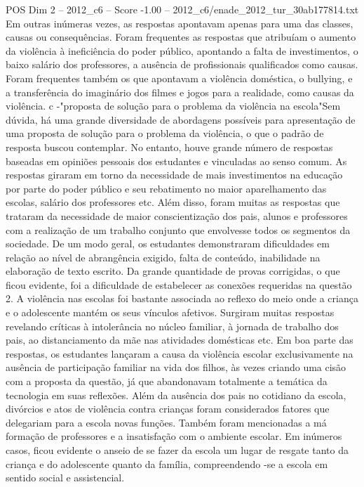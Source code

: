 \begin{textsample}{POS Dim 2 – 2012\_c6 – Score -1.00 – 2012\_c6/enade\_2012\_tur\_30ab177814.txt}
Em outras inúmeras vezes, as respostas apontavam apenas para uma das classes, causas ou consequências.
Foram frequentes as respostas que atribuíam o aumento da violência à ineficiência do poder público, apontando a falta de investimentos, o baixo salário dos professores, a ausência de profissionais qualificados como causas.
Foram frequentes também os que apontavam a violência doméstica, o bullying, e a transferência do imaginário dos filmes e jogos para a realidade, como causas da violência. c -"proposta de solução para o problema da violência na escola"Sem dúvida, há uma grande diversidade de abordagens possíveis para apresentação de uma proposta de solução para o problema da violência, o que o padrão de resposta buscou contemplar.
No entanto, houve grande número de respostas baseadas em opiniões pessoais dos estudantes e vinculadas ao senso comum.
As respostas giraram em torno da necessidade de mais investimentos na educação por parte do poder público e seu rebatimento no maior aparelhamento das escolas, salário dos professores etc.
Além disso, foram muitas as respostas que trataram da necessidade de maior conscientização dos pais, alunos e professores com a realização de um trabalho conjunto que envolvesse todos os segmentos da sociedade.
De um modo geral, os estudantes demonstraram dificuldades em relação ao nível de abrangência exigido, falta de conteúdo, inabilidade na elaboração de texto escrito.
Da grande quantidade de provas corrigidas, o que ficou evidente, foi a dificuldade de estabelecer as conexões requeridas na questão 2.
A violência nas escolas foi bastante associada ao reflexo do meio onde a criança e o adolescente mantém os seus vínculos afetivos.
Surgiram muitas respostas revelando críticas à intolerância no núcleo familiar, à jornada de trabalho dos pais, ao distanciamento da mãe nas atividades domésticas etc.
Em boa parte das respostas, os estudantes lançaram a causa da violência escolar exclusivamente na ausência de participação familiar na vida dos filhos, às vezes criando uma cisão com a proposta da questão, já que abandonavam totalmente a temática da tecnologia em suas reflexões.
Além da ausência dos pais no cotidiano da escola, divórcios e atos de violência contra crianças foram considerados fatores que delegariam para a escola novas funções.
Também foram mencionadas a má formação de professores e a insatisfação com o ambiente escolar.
Em inúmeros casos, ficou evidente o anseio de se fazer da escola um lugar de resgate tanto da criança e do adolescente quanto da família, compreendendo -se a escola em sentido social e assistencial.

\end{textsample}
